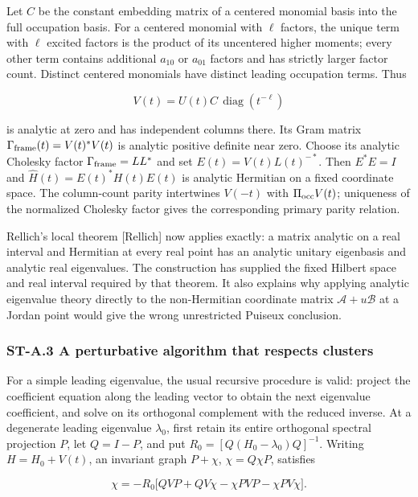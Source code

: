 \documentclass[a4paper,11pt]{article}
\numberwithin{equation}{section}
\begin{document}
Let \(C\) be the constant embedding matrix of a centered monomial basis into the full occupation basis. For a centered monomial with \(\ell\) factors, the unique term with \(\ell\) excited factors is the product of its uncentered higher moments; every other term contains additional \(a_{10}\) or \(a_{01}\) factors and has strictly larger factor count. Distinct centered monomials have distinct leading occupation terms. Thus

\[
V(t)=U(t)C\,\operatorname{diag}(t^{-\ell})
\]

is analytic at zero and has independent columns there. Its Gram matrix \(\Gamma_{\rm frame}(t)=V(t)^*V(t)\) is analytic positive definite near zero. Choose its analytic Cholesky factor \(\Gamma_{\rm frame}=LL^*\) and set \(E(t)=V(t)L(t)^{-*}\). Then \(E^*E=I\) and \(\widehat H(t)=E(t)^*H(t)E(t)\) is analytic Hermitian on a fixed coordinate space. The column-count parity intertwines \(V(-t)\) with \(\Pi_{\rm occ}V(t)\); uniqueness of the normalized Cholesky factor gives the corresponding primary parity relation.

Rellich's local theorem {[}Rellich{]} now applies exactly: a matrix analytic on a real interval and Hermitian at every real point has an analytic unitary eigenbasis and analytic real eigenvalues. The construction has supplied the fixed Hilbert space and real interval required by that theorem. It also explains why applying analytic eigenvalue theory directly to the non-Hermitian coordinate matrix \(\mathscr A+u\mathscr B\) at a Jordan point would give the wrong unrestricted Puiseux conclusion.

\hypertarget{st-a.3-a-perturbative-algorithm-that-respects-clusters}{%
\subsubsection{ST-A.3 A perturbative algorithm that respects clusters}\label{st-a.3-a-perturbative-algorithm-that-respects-clusters}}

For a simple leading eigenvalue, the usual recursive procedure is valid: project the coefficient equation along the leading vector to obtain the next eigenvalue coefficient, and solve on its orthogonal complement with the reduced inverse. At a degenerate leading eigenvalue \(\lambda_0\), first retain its entire orthogonal spectral projection \(P\), let \(Q=I-P\), and put \(R_0=[Q(H_0-\lambda_0)Q]^{-1}\). Writing \(H=H_0+V(t)\), an invariant graph \(P+\chi\), \(\chi=Q\chi P\), satisfies

\[
\chi=-R_0\big[
QVP+QV\chi-\chi PVP-\chi PV\chi
\big].
\]
\end{document}
